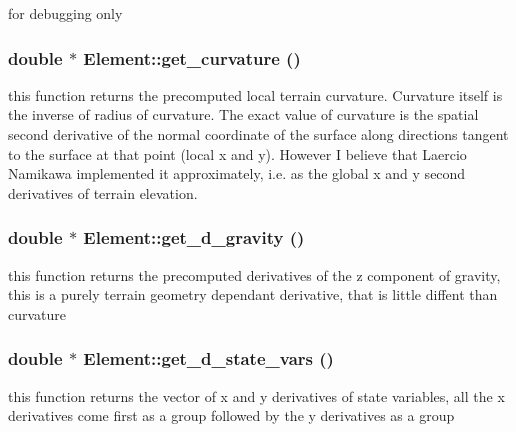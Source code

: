 for debugging only 

\hypertarget{classElement_a91}{
\subsubsection[get\_\-curvature]{\setlength{\rightskip}{0pt plus 5cm}double $\ast$ Element::get\_\-curvature ()}}
\label{classElement_a91}


this function returns the precomputed local terrain curvature. Curvature itself is the inverse of radius of curvature. The exact value of curvature is the spatial second derivative of the normal coordinate of the surface along directions tangent to the surface at that point (local x and y). However I believe that Laercio Namikawa implemented it approximately, i.e. as the global x and y second derivatives of terrain elevation. 

\hypertarget{classElement_a90}{
\subsubsection[get\_\-d\_\-gravity]{\setlength{\rightskip}{0pt plus 5cm}double $\ast$ Element::get\_\-d\_\-gravity ()}}
\label{classElement_a90}


this function returns the precomputed derivatives of the z component of gravity, this is a purely terrain geometry dependant derivative, that is little diffent than curvature 

\hypertarget{classElement_a66}{
\subsubsection[get\_\-d\_\-state\_\-vars]{\setlength{\rightskip}{0pt plus 5cm}double $\ast$ Element::get\_\-d\_\-state\_\-vars ()}}
\label{classElement_a66}


this function returns the vector of x and y derivatives of state variables, all the x derivatives come first as a group followed by the y derivatives as a group 

